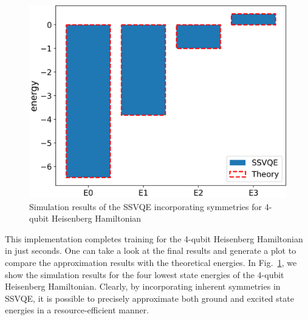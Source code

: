 \begin{figure}
	\centering
	\includegraphics[width=1\linewidth]{5.4.2_figure/result.png}
	\caption{Simulation results of the SSVQE incorporating symmetries for 4-qubit Heisenberg Hamiltonian}
	\label{fig:SSVQE_result}
\end{figure}

This implementation completes training for the 4-qubit Heisenberg Hamiltonian in just seconds. One can take a look at the final results and generate a plot to compare the approximation results with the theoretical energies. In Fig.~\ref{fig:SSVQE_result}, we show the simulation results for the four lowest state energies of the $4$-qubit Heisenberg Hamiltonian. Clearly, by incorporating inherent symmetries in SSVQE, it is possible to precisely approximate both ground and excited state energies in a resource-efficient manner.
